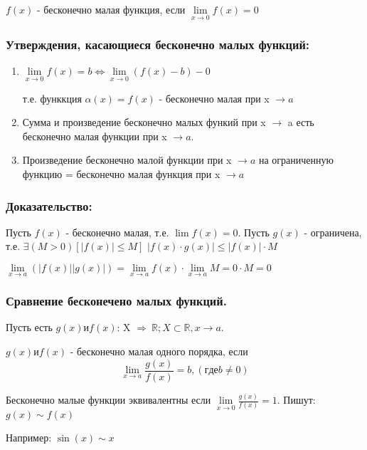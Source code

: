 \opred
	$f(x)$ - бесконечно малая функция, если $\lim\limits_{x\rightarrow0}f(x)=0$

	\subsubsection {Утверждения, касающиеся бесконечно малых функций:}
	\begin{enumerate}
		\item $\lim\limits_{x\rightarrow0}f(x)=b \Leftrightarrow \lim\limits_{x\rightarrow0}(f(x)-b)-0$

	     т.е. функкция $\alpha(x)=f(x)$ - бесконечно малая при x $\rightarrow a$

		\item Сумма и произведение бесконечно малых функий при x $\rightarrow$ a есть бесконечно малая функции при x $\rightarrow a$.

		\item Произведение бесконечно малой функции при x $\rightarrow a$ на ограниченную функцию = бесконечно малая функция при x $\rightarrow a$

		\end{enumerate}

	\subsubsection {Доказательство:}

	Пусть $f(x)$ - бесконечно малая, т.е. $\lim f(x)=0$. Пусть $g(x)$ - ограничена, т.е.
	$\exists(M>0)[|f(x)| \leq M]$ $|f(x)\cdot g(x)| \leq |f(x)|\cdot M$

	$\lim\limits_{x\rightarrow a}(|f(x)||g(x)|)=\lim\limits_{x\rightarrow a}f(x) \cdot \lim\limits_{x\rightarrow a}M = 0 \cdot M = 0$


	\subsubsection {Сравнение бесконечено малых функций.}

	Пусть есть $g(x) и f(x)$: X $\Rightarrow \ \mathbb {R}; X \subset  \mathbb {R}, x \rightarrow a$.

	$g(x) и f(x)$ - бесконечно малая одного порядка, если $$\lim\limits_{x\rightarrow a}\frac{g(x)}{f(x)}=b, (где b\neq 0)$$

	Бесконечно малые функции эквивалентны если $\lim\limits_{x \rightarrow 0}\frac{g(x)}{f(x)}=1$. Пишут: $g(x) \sim f(x)$

	Например: $\sin(x) \sim x$

